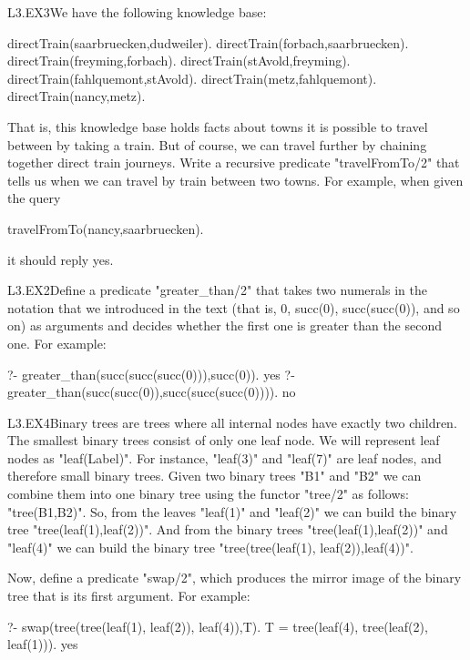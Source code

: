 \begin{LPNexercise}{L3.EX3}We have the following knowledge base:
\begin{LPNcodedisplay}
directTrain(saarbruecken,dudweiler).
directTrain(forbach,saarbruecken).
directTrain(freyming,forbach).
directTrain(stAvold,freyming).
directTrain(fahlquemont,stAvold).
directTrain(metz,fahlquemont).
directTrain(nancy,metz).
\end{LPNcodedisplay}

That is, this knowledge base holds facts about towns it is possible to
travel between by taking a  train.  But of course, we can
travel further by chaining together direct train journeys.  Write a
recursive predicate "travelFromTo/2" that tells us when we can
travel by train between two towns.  For example, when given the query
\begin{LPNcodedisplay}
travelFromTo(nancy,saarbruecken).
\end{LPNcodedisplay}
it should reply yes.
\end{LPNexercise}


\begin{LPNexercise}{L3.EX2}Define a predicate "greater\_than/2"
that takes two numerals in the notation that we introduced in the text
(that is, 0, succ(0), succ(succ(0)), and so on) as arguments and
decides whether the first one is greater than the second one. For example:
\begin{LPNcodedisplay}
?- greater_than(succ(succ(succ(0))),succ(0)).
yes
?- greater_than(succ(succ(0)),succ(succ(succ(0)))).
no
\end{LPNcodedisplay}
\end{LPNexercise}
\begin{LPNexercise}{L3.EX4}Binary trees
are trees where all internal nodes have exactly two children. The
smallest binary trees consist of only one leaf node. We will represent
leaf nodes as "leaf(Label)". For instance, "leaf(3)" and "leaf(7)" are
leaf nodes, and therefore small binary trees. Given two binary trees
"B1" and "B2" we can combine them into one binary tree using the
functor "tree/2" as follows: "tree(B1,B2)".  So, from the leaves
"leaf(1)" and "leaf(2)" we can build the binary tree
"tree(leaf(1),leaf(2))". And from the binary trees
"tree(leaf(1),leaf(2))" and "leaf(4)" we can build the binary tree
"tree(tree(leaf(1), leaf(2)),leaf(4))".


Now, define a predicate "swap/2", which produces the mirror
image of the binary tree that is its first argument. For example:
\begin{LPNcodedisplay}
?- swap(tree(tree(leaf(1), leaf(2)), leaf(4)),T).
T = tree(leaf(4), tree(leaf(2), leaf(1))).
yes
\end{LPNcodedisplay}
\end{LPNexercise}




